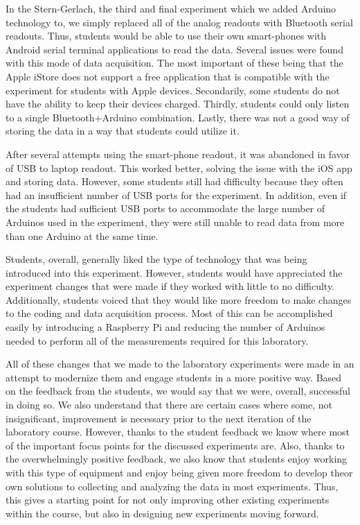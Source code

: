 In the Stern-Gerlach, the third and final experiment which we added Arduino technology to, we simply replaced all of the analog readouts with Bluetooth serial readouts.
Thus, students would be able to use their own smart-phones with Android serial terminal applications to read the data.
Several issues were found with this mode of data acquisition.
The most important of these being that the Apple iStore does not support a free application that is compatible with the experiment for students with Apple devices.
Secondarily, some students do not have the ability to keep their devices charged.
Thirdly, students could only listen to a single Bluetooth+Arduino combination.
Lastly, there was not a good way of storing the data in a way that students could utilize it.

After several attempts using the smart-phone readout, it was abandoned in favor of USB to laptop readout.
This worked better, solving the issue with the iOS app and storing data.
However, some students still had difficulty because they often had an insufficient number of USB ports for the experiment.
In addition, even if the students had sufficient USB ports to accommodate the large number of Arduinos used in the experiment, they were still unable to read data from more than one Arduino at the same time.

Students, overall, generally liked the type of technology that was being introduced into this experiment.
However, students would have appreciated the experiment changes that were made if they worked with little to no difficulty.
Additionally, students voiced that they would like more freedom to make changes to the coding and data acquisition process.
Most of this can be accomplished easily by introducing a Raspberry Pi and reducing the number of Arduinos needed to perform all of the measurements required for this laboratory.

All of these changes that we made to the laboratory experiments were made in an attempt to modernize them and engage students in a more positive way.
Based on the feedback from the students, we would say that we were, overall, successful in doing so.
We also understand that there are certain cases where some, not insignificant, improvement is necessary prior to the next iteration of the laboratory course.
However, thanks to the student feedback we know where most of the important focus points for the discussed experiments are.
Also, thanks to the overwhelmingly positive feedback, we also know that students enjoy working with this type of equipment and enjoy being given more freedom to develop theor own solutions to collecting and analyzing the data in most experiments.
Thus, this gives a starting point for not only improving other existing experiments within the course, but also in designing new experiments moving forward.
